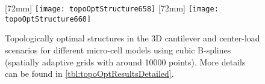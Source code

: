 \begin{figure}
  \newcommand*{\myscale}{0.19}%
  [72mm]{%
    \texttt{[image: topoOptStructure658]}%
  }%
  \hfill%
  [72mm]{%
    \texttt{[image: topoOptStructure660]}%
  }%
  \\[2mm]%
  \hspace*{6mm}
  \caption[Optimal structures in the 3D scenarios]{%
    Topologically optimal structures in the
    3D cantilever and center-load scenarios
    for different micro-cell models using cubic B-splines
    (spatially adaptive grids with around \num{10000} points).
    More details can be found in \cref{tbl:topoOptResultsDetailed}.%
  }%
  \label{fig:topoOptStructure3D}%
\end{figure}

